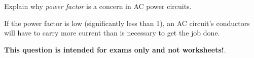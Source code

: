 

Explain why {\it power factor} is a concern in AC power circuits.







If the power factor is low (significantly less than 1), an AC circuit's conductors will have to carry more current than is necessary to get the job done.







{\bf This question is intended for exams only and not worksheets!}.



